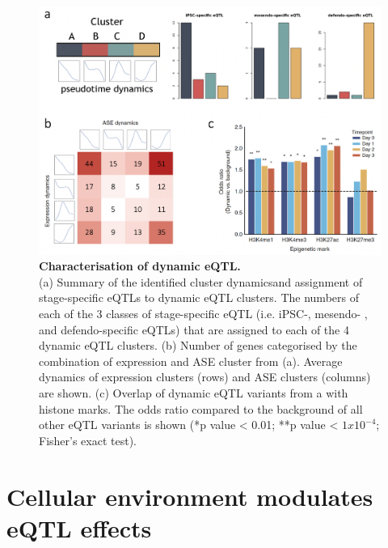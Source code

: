 \begin{figure}[htbp]
\centering
\includegraphics[width=16cm]{Chapter4/Fig/endodiff_dynamic_enrich.png}
\caption[Characterisation of dynamic eQTL]{\textbf{Characterisation of dynamic eQTL.}\\
(a) Summary of the identified cluster dynamics\footnotemark and assignment of stage-specific eQTLs to dynamic eQTL clusters. 
The numbers of each of the 3 classes of stage-specific eQTL (i.e. iPSC-, mesendo- , and defendo-specific eQTLs) that are assigned to each of the 4 dynamic eQTL clusters.
(b) Number of genes categorised by the combination of expression and ASE cluster from (a). 
Average dynamics of expression clusters (rows) and ASE clusters (columns) are shown.
(c) Overlap of dynamic eQTL variants from a with histone marks. The odds ratio compared to the background of all other eQTL variants is shown (*p value < 0.01; **p value < $1x10^{-4}$; Fisher’s exact test).}
\label{fig:endodiff_dynamic_eqtl_enrichment}
\end{figure}


\clearpage

\section{Cellular environment modulates eQTL effects}

